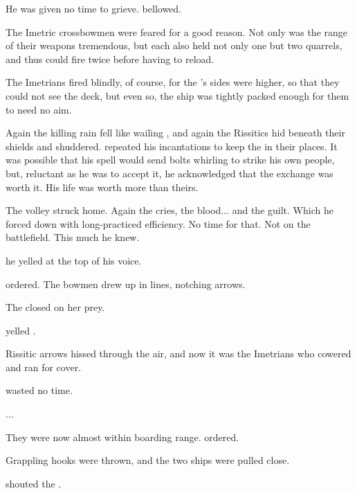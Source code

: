 He was given no time to grieve.  \Kufur bellowed. 

 The Imetric crossbowmen were feared for a good reason. Not only was the range of their weapons tremendous, but each also held not only one but two quarrels, and thus could fire twice before having to reload. 

The Imetrians fired blindly, of course, for the \MotherTiamat's sides were higher, so that they could not see the deck, but even so, the ship was tightly packed enough for them to need no aim. 

Again the killing rain fell like wailing \daemons, and again the Rissitics hid beneath their shields and shuddered. \Narkiza{} repeated his incantations to keep the \BodyCreatures{} in their places. It was possible that his spell would send bolts whirling to strike his own people, but, reluctant as he was to accept it, he acknowledged that the exchange was worth it. His life was worth more than theirs. 

The volley struck home. Again the cries, the blood... and the guilt. Which he forced down with long-practiced efficiency. No time for that. Not on the battlefield. This much he knew. 

 he yelled at the top of his voice. 

 \Kufur{} ordered.  The bowmen drew up in lines, notching arrows. 

The \MotherTiamat{} closed on her prey. 

 yelled \Kufur{}. 

Rissitic arrows hissed through the air, and now it was the Imetrians who cowered and ran for cover. 

\Kufur{} wasted no time. 

...

They were now almost within boarding range.  \Kufur{} ordered. 

Grappling hooks were thrown, and the two ships were pulled close. 

 shouted the \Ashenoch.  

